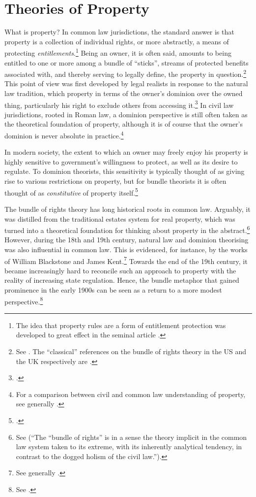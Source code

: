 \section{Theories of Property}\label{sec:top}

What is property? In common law jurisdictions, the standard answer is that property is a collection of individual rights, or more abstractly, a means of protecting {\it entitlements}.\footnote{The idea that property rules are a form of entitlement protection was developed to great effect in the seminal article \cite{calabresi72}.} Being an owner, it is often said, amounts to being entitled to one or more among a bundle of ``sticks'', streams of protected benefits associated with, and thereby serving to legally define, the property in question.\footnote{See \cite[357-358]{merrill01}. The ``classical'' references on the bundle of rights theory in the US and the UK respectively are \cite{hohfeld17,honore61}.} This point of view was first developed by legal realists in response to the natural law tradition, which  property in terms of the owner's dominion over the owned thing, particularly his right to exclude others from accessing it.\footcite[193-195]{klein11} In civil law jurisdictions, rooted in Roman law, a dominion perspective is still often taken as the theoretical foundation of property, although it is of course  that the owner's dominion is never absolute in practice.\footnote{For a comparison between civil and common law understanding of property, see generally \cite{chang12}.}

In modern society, the extent to which an owner may freely enjoy his property is highly sensitive to government's willingness to protect, as well as its desire to regulate. To dominion theorists, this sensitivity is typically thought of as giving rise to various restrictions on property, but for bundle theorists it is often thought of as {\it constitutive} of property itself.\footcite[7]{chang12} 

The bundle of rights theory has long historical roots in common law. Arguably, it was distilled from the traditional estates system for real property, which was turned into a theoretical foundation for thinking about property in the abstract.\footnote{See \cite[7]{chang12}(``The ``bundle of rights'' is in a sense the theory implicit in the common law system taken to its extreme, with its inherently analytical tendency, in contrast to the dogged holism of the civil law.'').} However, during the 18th and 19th century, natural law and dominion theorising was also influential in common law. This is evidenced, for instance, by the works of William Blackstone and James Kent.\footnote{See generally \cite{blackstone79b,kent27}.} Towards the end of the 19th century, it became increasingly hard to reconcile such an approach to property with the reality of increasing state regulation. Hence, the bundle metaphor that gained prominence in the early 1900s can be seen as a return to a more modest perspective.\footnote{See \cite[195]{klein11}.}


